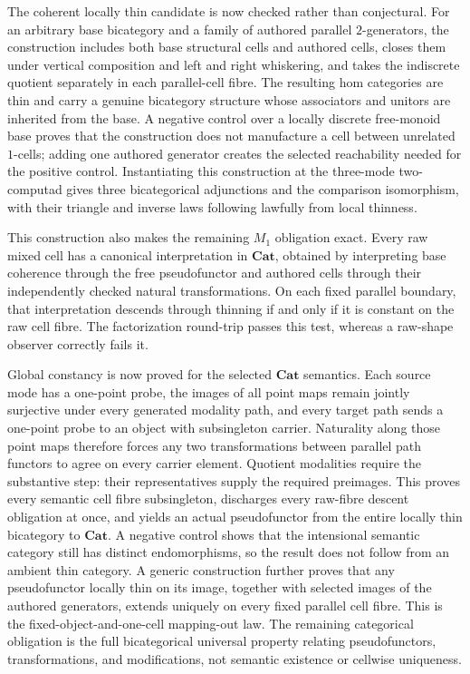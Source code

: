 \documentclass[11pt]{article}
\theoremstyle{definition}
\theoremstyle{remark}
\begin{document}
The coherent locally thin candidate is now checked rather than conjectural.
For an arbitrary base bicategory and a family of authored parallel
$2$-generators, the construction includes both base structural cells and
authored cells, closes them under vertical composition and left and right
whiskering, and takes the indiscrete quotient separately in each parallel-cell
fibre.  The resulting hom categories are thin and carry a genuine bicategory
structure whose associators and unitors are inherited from the base.  A
negative control over a locally discrete free-monoid base proves that the
construction does not manufacture a cell between unrelated $1$-cells; adding
one authored generator creates the selected reachability needed for the
positive control.  Instantiating this construction at the three-mode
two-computad gives three bicategorical adjunctions and the comparison
isomorphism, with their triangle and inverse laws following lawfully from local
thinness.

This construction also makes the remaining $M_1$ obligation exact.  Every raw
mixed cell has a canonical interpretation in $\mathbf{Cat}$, obtained by
interpreting base coherence through the free pseudofunctor and authored cells
through their independently checked natural transformations.  On each fixed
parallel boundary, that interpretation descends through thinning if and only
if it is constant on the raw cell fibre.  The factorization round-trip passes
this test, whereas a raw-shape observer correctly fails it.

Global constancy is now proved for the selected $\mathbf{Cat}$ semantics.  Each
source mode has a one-point probe, the images of all point maps remain jointly
surjective under every generated modality path, and every target path sends a
one-point probe to an object with subsingleton carrier.  Naturality along those
point maps therefore forces any two transformations between parallel path
functors to agree on every carrier element.  Quotient modalities require the
substantive step: their representatives supply the required preimages.  This
proves every semantic cell fibre subsingleton, discharges every raw-fibre
descent obligation at once, and yields an actual pseudofunctor from the entire
locally thin bicategory to $\mathbf{Cat}$.  A negative control shows that the
intensional semantic category still has distinct endomorphisms, so the result
does not follow from an ambient thin category.  A generic construction further
proves that any pseudofunctor locally thin on its image, together with selected
images of the authored generators, extends uniquely on every fixed parallel
cell fibre.  This is the fixed-object-and-one-cell mapping-out law.  The
remaining categorical obligation is the full bicategorical universal property
relating pseudofunctors, transformations, and modifications, not semantic
existence or cellwise uniqueness.
\end{document}

